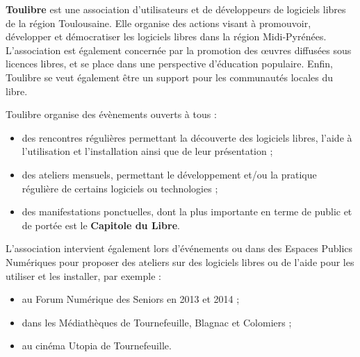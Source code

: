 
\textbf{Toulibre} est une association d'utilisateurs et de développeurs de logiciels libres de la région Toulousaine. Elle organise des actions visant à promouvoir, développer et démocratiser les logiciels libres dans la région Midi-Pyrénées. L'association est également concernée par la promotion des œuvres diffusées sous licences libres, et se place dans une perspective d'éducation populaire. Enfin, Toulibre se veut également être un support pour les communautés locales du libre.

\Separateur

Toulibre organise des évènements ouverts à tous :
\begin{itemize}[label=$\bullet$]
\item des rencontres régulières permettant la découverte des logiciels libres, l'aide à l'utilisation et l'installation ainsi que de leur présentation ;
\item des ateliers mensuels, permettant le développement et/ou la 
pratique régulière de certains logiciels ou technologies ;
\item des manifestations ponctuelles, dont la plus importante en terme 
de public et de portée est le \textbf{Capitole du Libre}.
\end{itemize}

L'association intervient également lors d'événements ou dans des Espaces Publics Numériques pour proposer des ateliers sur des logiciels libres ou de l'aide pour les utiliser et les installer, par exemple :
\begin{itemize}[label=$\bullet$]
\item au Forum Numérique des Seniors en 2013 et 2014 ;
\item dans les Médiathèques de Tournefeuille, Blagnac et Colomiers ;
\item au cinéma Utopia de Tournefeuille.
\end{itemize}
